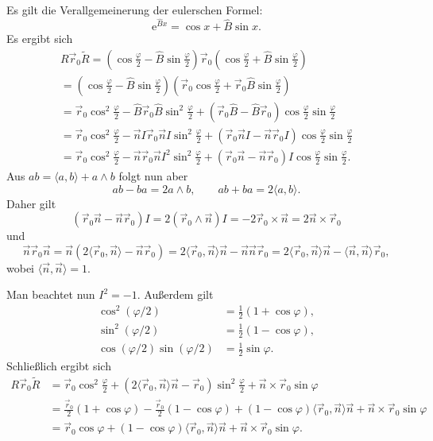 \documentclass[a4paper,fleqn,11pt,dvipdfmx]{scrartcl}
\newcommand{\ee}{\mathrm e}
\begin{document}
Es gilt die Verallgemeinerung der eulerschen Formel:
\begin{equation}
\ee^{\hat B x} = \cos x +\hat B\sin x.
\end{equation}
Es ergibt sich
\begin{gather}
R\vec r_0\tilde R = (\cos\tfrac{\varphi}{2}-\hat B\sin\tfrac{\varphi}{2})
\vec r_0(\cos\tfrac{\varphi}{2}+\hat B\sin\tfrac{\varphi}{2})\\
= (\cos\tfrac{\varphi}{2}-\hat B\sin\tfrac{\varphi}{2})
(\vec r_0\cos\tfrac{\varphi}{2}+\vec r_0\hat B\sin\tfrac{\varphi}{2})\\
= \vec r_0\cos^2\tfrac{\varphi}{2}-\hat B\vec r_0\hat B\sin^2\tfrac{\varphi}{2}
+ (\vec r_0\hat B-\hat B\vec r_0)\cos\tfrac{\varphi}{2}\sin\tfrac{\varphi}{2}\\
= \vec r_0\cos^2\tfrac{\varphi}{2}-\vec n I\vec r_0\vec n I\sin^2\tfrac{\varphi}{2}
+(\vec r_0\vec n I -\vec n \vec r_0 I)\cos\tfrac{\varphi}{2}\sin\tfrac{\varphi}{2}\\
= \vec r_0\cos^2\tfrac{\varphi}{2}-\vec n \vec r_0\vec n I^2\sin^2\tfrac{\varphi}{2}
+(\vec r_0\vec n-\vec n \vec r_0)I\cos\tfrac{\varphi}{2}\sin\tfrac{\varphi}{2}.
\end{gather}
Aus $ab = \langle a,b\rangle+a\wedge b$ folgt nun aber
\begin{equation}
ab-ba = 2a\wedge b,\qquad ab+ba = 2\langle a,b\rangle.
\end{equation}
Daher gilt
\begin{equation}
(\vec r_0\vec n-\vec n\vec r_0)I = 2(\vec r_0\wedge\vec n)I
= -2\vec r_0\times\vec n = 2\vec n\times\vec r_0
\end{equation}
und
\begin{equation}
\vec n \vec r_0\vec n = \vec n(2\langle\vec r_0,\vec n\rangle-\vec n\vec r_0)
= 2\langle\vec r_0,\vec n\rangle\vec n - \vec n\vec n\vec r_0
= 2\langle\vec r_0,\vec n\rangle\vec n - \langle\vec n,\vec n\rangle\vec r_0,
\end{equation}
wobei $\langle\vec n,\vec n\rangle=1$.

Man beachtet nun $I^2=-1$. Außerdem gilt
\begin{align}
\cos^2(\varphi/2)&=\tfrac{1}{2}(1+\cos\varphi),\\
\sin^2(\varphi/2)&=\tfrac{1}{2}(1-\cos\varphi),\\
\cos(\varphi/2)\sin(\varphi/2)&=\tfrac{1}{2}\sin\varphi.
\end{align}
Schließlich ergibt sich
\begin{align}
R\vec r_0\tilde R
&= \vec r_0\cos^2\tfrac{\varphi}{2}+(2\langle\vec r_0,\vec n\rangle\vec n - \vec r_0)\sin^2\tfrac{\varphi}{2}
+\vec n\times\vec r_0\sin\varphi\\
&= \tfrac{\vec r_0}{2}(1+\cos\varphi)-\tfrac{\vec r_0}{2}(1-\cos\varphi)
+(1-\cos\varphi)\langle\vec r_0,\vec n\rangle\vec n
+\vec n\times\vec r_0\sin\varphi\\
&= \vec r_0\cos\varphi
+(1-\cos\varphi)\langle\vec r_0,\vec n\rangle\vec n
+\vec n\times\vec r_0\sin\varphi.
\end{align}
\end{document}
